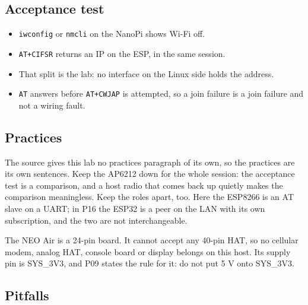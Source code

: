 \subsection*{Acceptance test}

\begin{itemize}
\item \texttt{iwconfig} or \texttt{nmcli} on the NanoPi shows Wi-Fi off.
\item \texttt{AT+CIFSR} returns an IP on the ESP, in the same session.
\item That split is the lab: no interface on the Linux side holds the address.
\item \texttt{AT} answers before \texttt{AT+CWJAP} is attempted, so a join failure is a join failure and not a wiring fault.
\end{itemize}

\subsection*{Practices}

The source gives this lab no practices paragraph of its own, so the practices are its own sentences. Keep the AP6212 down for the whole session: the acceptance test is a comparison, and a host radio that comes back up quietly makes the comparison meaningless. Keep the roles apart, too. Here the ESP8266 is an AT slave on a UART; in P16 the ESP32 is a peer on the LAN with its own subscription, and the two are not interchangeable.

The NEO Air is a 24-pin board. It cannot accept any 40-pin HAT, so no cellular modem, analog HAT, console board or display belongs on this host. Its supply pin is SYS\_3V3, and P09 states the rule for it: do not put 5 V onto SYS\_3V3.

\subsection*{Pitfalls}

